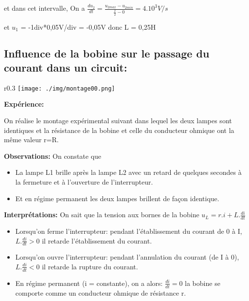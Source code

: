 \documentclass[12pt]{article}
\begin{document}
et dans cet intervalle,  On a $\frac{du_2}{dt} = \frac{u_{2max} - u_{2min}}{\frac{T}{2} - 0} = 4.10^3 V/s$

et $u_1$ = -1div*0,05V/div = -0,05V donc L = 0,25H

\subsection{Influence de la bobine sur le passage du courant dans un circuit:}

\begin{wrapfigure}[6]{r}{0.3\textwidth}
	\texttt{[image: ./img/montage00.png]}
\end{wrapfigure}


\textbf{Expérience: }

On réalise le montage expérimental suivant dans lequel les deux lampes sont
identiques et la résistance de la bobine et celle du conducteur ohmique ont la même valeur r=R.


\textbf{Observations: }On constate que 

\begin{itemize}
	\item La lampe L1 brille après la lampe L2 avec un retard de quelques secondes à la fermeture et à l'ouverture de l'interrupteur.

	\item Et en régime permanent les deux lampes brillent de façon identique.

\end{itemize}

\textbf{Interprétations: }On sait que la tension aux bornes de la bobine $u_L = r.i + L.\frac{di}{dt}$

\begin{itemize}
	\item Lorsqu'on ferme l'interrupteur: pendant l'établissement du courant de 0 à I, $L.\frac{di}{dt} > 0$ il retarde l'établissement du courant.

	\item Lorsqu'on ouvre l'interrupteur: pendant l'annulation du courant (de I à 0),$L.\frac{di}{dt} < 0$ il retarde la rupture du courant.

	\item En régime permanent (i = constante), on a alors: $\frac{di}{dt} = 0$ la bobine se comporte comme un conducteur ohmique de résistance r.

\end{itemize}
\end{document}
